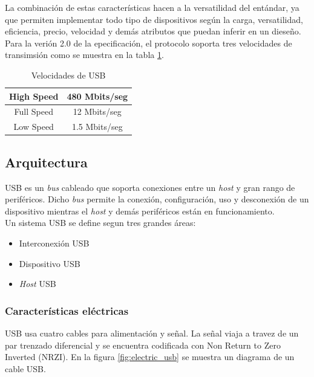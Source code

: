 La combinaci\'on de estas caracter\'isticas hacen a la versatilidad del
ent\'andar, ya que permiten implementar todo tipo de dispositivos seg\'un la
carga, versatilidad, eficiencia, precio, velocidad y dem\'as atributos que
puedan inferir en un diese\~no.\\

Para la veri\'on 2.0 de la epecificaci\'on, el protocolo soporta tres
velocidades de transimsi\'on como se muestra en la
tabla \ref{tab:velocidad_usb}.

\begin{table}[h]
\centering
\begin{tabular}{|c|c|}        \hline
High Speed & 480 Mbits/seg \\ \hline 
Full Speed & 12 Mbits/seg  \\ \hline
Low Speed & 1.5 Mbits/seg  \\ \hline
\end{tabular}
\caption{Velocidades de USB} 
\label{tab:velocidad_usb}
\end{table}

\subsection{Arquitectura}

USB es un \emph{bus} cableado que soporta conexiones entre un \emph{host} y
gran rango de perif\'ericos. Dicho \emph{bus} permite la conexi\'on,
configuraci\'on, uso y desconexi\'on de un dispositivo mientras el \emph{host}
y dem\'as perif\'ericos est\'an en funcionamiento. \\

Un sistema USB se  define segun tres grandes \'areas:

\begin{itemize}
 \item Interconexi\'on USB
 \item Dispositivo USB
 \item \emph{Host} USB
\end{itemize}

\subsubsection{Caracter\'isticas el\'ectricas}

USB usa cuatro cables para alimentaci\'on y se\~nal. La se\~nal viaja a travez
de un par trenzado diferencial y se encuentra codificada con Non Return to Zero
Inverted (NRZI). En la figura \ref{fig:electric_usb} se muestra un diagrama de
un cable
USB.

